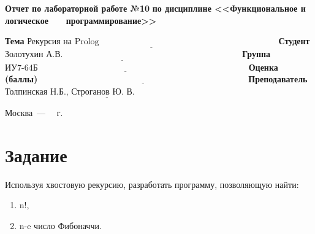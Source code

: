 \documentclass[12pt]{report}
\begin{document}
\begin{titlepage}
		\begin{center}
			\noindent\begin{minipage}{1.1\textwidth}\centering
				\Large\textbf{Отчет по лабораторной работе №10}\newline
				\textbf{по дисциплине <<Функциональное и логическое}\newline
				\textbf{~~~программирование>>}\newline\newline
			\end{minipage}
		\end{center}
		
		\noindent\textbf{Тема} $\underline{\text{Рекурсия на Prolog~~~~~~~~~~~~~~~~~~~~~~~~~~~~~~~~~~~~~~~~~~~~~~~~~~~~~~~~~~~~~~}}$\newline\newline
		\noindent\textbf{Студент} $\underline{\text{Золотухин А.В.~~~~~~~~~~~~~~~~~~~~~~~~~~~~~~~~~~~~~~~~~~~~~~~~~~~~~~~~~~~~~~}}$\newline\newline
		\noindent\textbf{Группа} $\underline{\text{ИУ7-64Б~~~~~~~~~~~~~~~~~~~~~~~~~~~~~~~~~~~~~~~~~~~~~~~~~~~~~~~~~~~~~~~~~~~~~~~~~}}$\newline\newline
		\noindent\textbf{Оценка (баллы)} $\underline{\text{~~~~~~~~~~~~~~~~~~~~~~~~~~~~~~~~~~~~~~~~~~~~~~~~~~~~~~~~~~~~~~~~~~~~~~~~}}$\newline\newline
		\noindent\textbf{Преподаватель} $\underline{\text{Толпинская Н.Б., Строганов Ю. В.~~~~~~~~~~~~~~~~~~~~~~~~~~}}$\newline\newline\newline
		
		\begin{center}
			\vfill
			Москва~---~\the\year
			~г.
		\end{center}
	\end{titlepage}
	
	
	\section*{Задание}
	Используя хвостовую рекурсию, разработать программу, позволяющую найти:
	\begin{enumerate}
		\item  n!,
		\item n-e число Фибоначчи.
	\end{enumerate}
	
\end{document}
